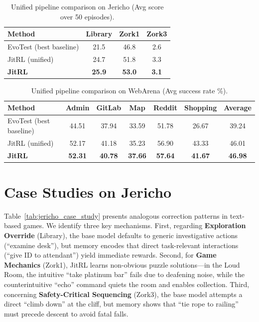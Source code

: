 \begin{table}[h]
\centering
\caption{Unified pipeline comparison on Jericho (Avg score over 50 episodes).}
\label{tab:unified_jericho}
\vskip 0.1in
\begin{tabular}{lccc}
\toprule
\textbf{Method} & \textbf{Library} & \textbf{Zork1} & \textbf{Zork3} \\
\midrule
EvoTest (best baseline) & 21.5          & 46.8           & 2.6            \\
JitRL (unified)         & 24.7          & 51.8           & 3.3            \\
\textbf{JitRL}          & \textbf{25.9} & \textbf{53.0}  & \textbf{3.1}   \\
\bottomrule
\end{tabular}
\end{table}

\begin{table}[h]
\centering
\caption{Unified pipeline comparison on WebArena (Avg success rate \%).}
\label{tab:unified_webarena}
\vskip 0.1in
\begin{tabular}{lcccccc}
\toprule
\textbf{Method} & \textbf{Admin} & \textbf{GitLab} & \textbf{Map} & \textbf{Reddit} & \textbf{Shopping} & \textbf{Average} \\
\midrule
EvoTest (best baseline) & 44.51          & 37.94           & 33.59        & 51.78           & 26.67             & 39.24            \\
JitRL (unified)         & 52.17          & 41.18           & 35.23        & 56.90           & 43.33             & 46.01            \\
\textbf{JitRL}          & \textbf{52.31} & \textbf{40.78}  & \textbf{37.66} & \textbf{57.64} & \textbf{41.67}    & \textbf{46.98}   \\
\bottomrule
\end{tabular}
\end{table}


\section{Case Studies on Jericho}
\label{app:case_jericho}


Table~\ref{tab:jericho_case_study} presents analogous correction patterns in text-based games. We identify three key mechanisms. First, regarding \textbf{Exploration Override} (Library), the base model defaults to generic investigative actions (``examine desk''), but memory encodes that direct task-relevant interactions (``give ID to attendant'') yield immediate rewards. Second, for \textbf{Game Mechanics} (Zork1), JitRL learns non-obvious puzzle solutions---in the Loud Room, the intuitive ``take platinum bar'' fails due to deafening noise, while the counterintuitive ``echo'' command quiets the room and enables collection. Third, concerning \textbf{Safety-Critical Sequencing} (Zork3), the base model attempts a direct ``climb down'' at the cliff, but memory shows that ``tie rope to railing'' must precede descent to avoid fatal falls.



